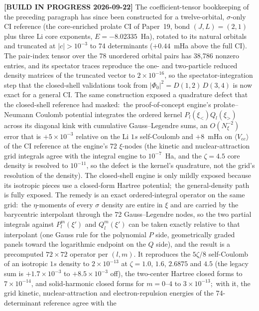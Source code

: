 \documentclass[aps,pra,twocolumn,superscriptaddress,longbibliography]{revtex4-2}
\begin{document}
\textbf{[BUILD IN PROGRESS 2026-09-22]}  The coefficient-tensor bookkeeping of
the preceding paragraph has since been constructed for a twelve-orbital,
$\sigma$-only CI reference (the core-enriched prolate CI of Paper~19, bond
$(J,L)=(2,1)$ plus three Li core exponents, $E=-8.02335$~Ha), rotated to its
natural orbitals and truncated at $|c|>10^{-3}$ to 74 determinants
($+0.44$~mHa above the full CI).  The pair-index tensor over the 78 unordered
orbital pairs has 38{,}786 nonzero entries, and its spectator traces reproduce
the one- and two-particle reduced density matrices of the truncated vector to
$2\times10^{-16}$, so the spectator-integration step that the closed-shell
validations took from $|\Phi_0|^2=D(1,2)\,D(3,4)$ is now exact for a general
CI.  The same construction exposed a quadrature defect that the closed-shell
reference had masked:\ the proof-of-concept engine's prolate--Neumann Coulomb
potential integrates the ordered kernel $P_l(\xi_<)Q_l(\xi_>)$ across its
diagonal kink with cumulative Gauss--Legendre sums, an $O(N_\xi^{-2})$ error
that is $+5\times10^{-3}$ relative on the Li $1s$ self-Coulomb and $+8$~mHa on
$\langle V_{ee}\rangle$ of the CI reference at the engine's 72 $\xi$-nodes
(the kinetic and nuclear-attraction grid integrals agree with the integral
engine to $10^{-7}$~Ha, and the $\zeta=4.5$ core density is resolved to
$10^{-11}$, so the defect is the kernel's quadrature, not the grid's
resolution of the density).  The closed-shell engine is only mildly exposed
because its isotropic pieces use a closed-form Hartree potential;\ the
general-density path is fully exposed.  The remedy is an exact
ordered-integral operator on the same grid:\ the $\eta$-moments of every
$\sigma$ density are entire in $\xi$ and are carried by the barycentric
interpolant through the 72 Gauss--Legendre nodes, so the two partial
integrals against $P_l^m(\xi')$ and $Q_l^m(\xi')$ can be taken exactly
relative to that interpolant (one Gauss rule for the polynomial $P$ side,
geometrically graded panels toward the logarithmic endpoint on the $Q$ side),
and the result is a precomputed $72\times72$ operator per $(l,m)$.  It
reproduces the $5\zeta/8$ self-Coulomb of an isotropic $1s$ density to
$2\times10^{-13}$ at $\zeta=1.0$, $1.6$, $2.6875$ and $4.5$ (the legacy sum
is $+1.7\times10^{-3}$ to $+8.5\times10^{-3}$ off), the two-center Hartree
closed forms to $7\times10^{-14}$, and solid-harmonic closed forms for
$m=0$--$4$ to $3\times10^{-13}$;\ with it, the grid kinetic, nuclear-attraction
and electron-repulsion energies of the 74-determinant reference agree with the
\end{document}
